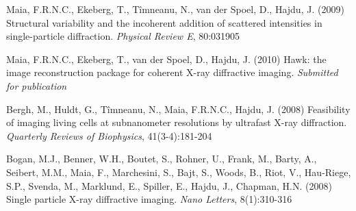 {\begin{romanlist}
    \item 
      \label{dynamics}
      Maia, F.R.N.C., Ekeberg, T., T\^{i}mneanu, N., van der Spoel, D., Hajdu,
      J. (2009) Structural variability and the incoherent addition of scattered
      intensities in single-particle diffraction. {\em Physical Review E}, 80:031905
      
    \item 
      \label{hawk}
      Maia, F.R.N.C.,  Ekeberg, T., van der Spoel, D., Hajdu, J. (2010)
      Hawk: the image reconstruction package for coherent X-ray diffractive
      imaging. {\em Submitted for publication}
\end{romanlist}

\vspace{1\baselineskip} 

\clearpage 


\vspace{1cm}

\begin{romanlist}
  \setcounter{romanlistc}{5}
\item Bergh, M., Huldt, G., T\^{i}mneanu, N., Maia, F.R.N.C., Hajdu, J. (2008)
  Feasibility of imaging living cells at subnanometer resolutions by ultrafast
  X-ray diffraction. {\em Quarterly Reviews of Biophysics}, 41(3-4):181-204
  \label{QRB}
\item Bogan, M.J., Benner, W.H., Boutet, S., Rohner, U., Frank, M., Barty, A.,
  Seibert, M.M., Maia, F., Marchesini, S., Bajt, S., Woods, B., Riot, V.,
  Hau-Riege, S.P., Svenda, M., Marklund, E., Spiller, E., Hajdu, J., Chapman,
  H.N. (2008) Single particle X-ray diffractive imaging. {\em Nano Letters},
  8(1):310-316
  \label{nano}
\end{romanlist}
}


\newcommand{\dedication}%
{\cleardoublepage
\thispagestyle{empty}
\vspace*{\stretch{3}}
\begin{flushright}
		
{\fontfamily{pzc}\Large\selectfont\emph{to my grandparents...}}

\end{flushright}
\vspace*{\stretch{1}}} %

